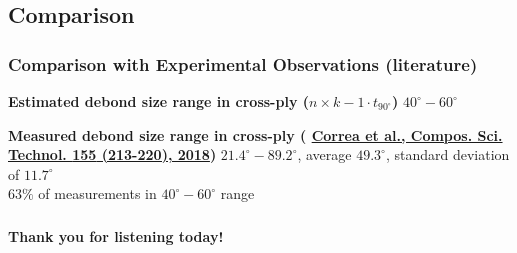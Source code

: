 \documentclass[first,firstsupp,lastsupp,last,hyperref,table]{ETHclass}
\begin{document}
\subsection{Comparison}

\begin{frame}
\frametitle{\vspace{0.2cm}\small Comparison with Experimental Observations (literature)}
\vspace{-0.5cm}
\centering
\scriptsize
\begin{alertblock}{\centering\scriptsize\bf Estimated debond size range in cross-ply ($n\times k-1\cdot t_{90^{\circ}}$)}
\centering
$40^{\circ}-60^{\circ}$
\end{alertblock}
\pgfmathsetmacro{}
\pgfmathsetmacro{}
\begin{alertblock}{\centering\scriptsize\bf Measured debond size range in cross-ply ({\fontsize{\fontsizeref}{\stretchref} \selectfont \href{https://doi.org/10.1016/j.compscitech.2017.12.009}{Correa et al., Compos. Sci. Technol. \textbf{155} (213-220), 2018}})}
\centering
$21.4^{\circ}-89.2^{\circ}$, average $49.3^{\circ}$, standard deviation of $11.7^{\circ}$\\ $63\%$ of measurements in $40^{\circ}-60^{\circ}$ range
\end{alertblock}
\end{frame}

%

\begin{frame}
\frametitle{}
\centering
\vspace{0.5cm}
\LARGE
\textbf{Thank you for listening today!}
\end{frame}

\begin{frame}[plain]
\frametitle{}
\end{frame}
\end{document}
